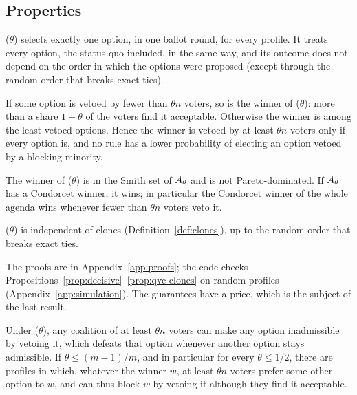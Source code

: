 \subsection{Properties}

\begin{proposition}\label{prop:decisive}
\QVC($\theta$) selects exactly one option, in one ballot round, for every profile. It treats every option,
the status quo included, in the same way, and its outcome does not depend on the order in which the
options were proposed (except through the random order that breaks exact ties).
\end{proposition}

\begin{proposition}\label{prop:acceptability}
If some option is vetoed by fewer than $\theta n$ voters, so is the winner of \QVC($\theta$): more than a
share $1-\theta$ of the voters find it acceptable. Otherwise the winner is among the least-vetoed
options. Hence the winner is vetoed by at least $\theta n$ voters only if every option is, and no rule
has a lower probability of electing an option vetoed by a blocking minority.
\end{proposition}

\begin{proposition}\label{prop:condorcet-admissible}
The winner of \QVC($\theta$) is in the Smith set of $A_\theta$ and is not Pareto-dominated. If $A_\theta$ has a
Condorcet winner, it wins; in particular the Condorcet winner of the whole agenda wins whenever fewer
than $\theta n$ voters veto it.
\end{proposition}

\begin{proposition}\label{prop:qvc-clones}
\QVC($\theta$) is independent of clones (Definition~\ref{def:clones}), up to the random order that breaks
exact ties.
\end{proposition}

The proofs are in Appendix~\ref{app:proofs}; the code checks Propositions~\ref{prop:decisive}--\ref{prop:qvc-clones} on random profiles
(Appendix~\ref{app:simulation}). The guarantees have a price, which is the subject of the
last result.

\begin{proposition}\label{prop:blocking}
Under \QVC($\theta$), any coalition of at least $\theta n$ voters can make any option inadmissible by
vetoing it, which defeats that option whenever another option stays admissible. If $\theta \le (m-1)/m$,
and in particular for every $\theta \le 1/2$, there are profiles in which, whatever the winner $w$, at
least $\theta n$ voters prefer some other option to $w$, and can thus block $w$ by vetoing it although
they find it acceptable.
\end{proposition}

